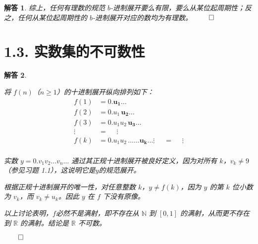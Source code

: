 \documentclass[12pt,UTF8]{ctexbook}
\theoremstyle{exercisestyle}
\theoremstyle{solutionstyle}
\newtheorem*{solution*}{解答}
\newenvironment{solution}
  {\begin{solution*}}
  {\hfill\ensuremath{\qed}\end{solution*}}
\begin{document}
\begin{solution}
综上，任何有理数的规范 $b$-进制展开要么有限，要么从某位起周期性；反之，任何从某位起周期性的 $b$-进制展开对应的数均为有理数。
\end{solution}

\section{1.3. 实数集的不可数性}\label{non-dénombrabilité-de-r}
\begin{solution}
\begin{subquestions}
\item 将 $f(n)$（$n \geq 1$）的十进制展开纵向排列如下：
\begin{align*}
f(1) &= 0.\mathbf{u_1}\ldots \\
f(2) &= 0.u_1\,\mathbf{u_2}\ldots \\
f(3) &= 0.u_1u_2\,\mathbf{u_3}\ldots \\
\vdots\;\; &= \quad \;\vdots \\
f(k) &= 0.u_1u_2\,\ldots\ldots \mathbf{u_k}\ldots
\vdots\;\; &= \quad \;\vdots \\
\end{align*}

实数 $y = 0.v_1 v_2 \ldots v_n \ldots$ 通过其正规十进制展开被良好定义，因为对所有 $k$，$v_k \neq 9$（参见习题 1.1），这说明它是$y$的规范展开。

\item 根据正规十进制展开的唯一性，对任意整数 $k$，$y \neq f(k)$，因为 $y$ 的第 $k$ 位小数为 $v_k$，而 $v_k \neq u_k$。因此 $y$ 在 $f$ 下没有原像。

\item 以上讨论表明，$f$必然不是满射，即不存在从 $\mathbb{N}$ 到 $[0,1]$ 的满射，从而更不存在到 $\mathbb{R}$ 的满射。结论是 $\mathbb{R}$ 不可数。
\end{subquestions}
\end{solution}
\end{document}
